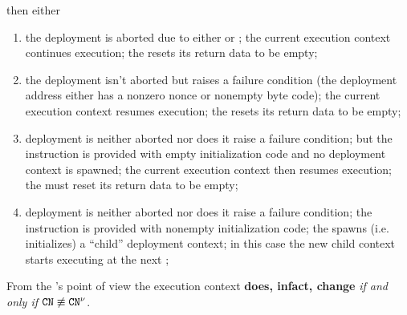 \begin{description}
		then either
		\begin{enumerate}
			\item
				the deployment is aborted due to either \balAbortSH{} or \csdAbortSH{};
				the current execution context continues execution;
				the \zkEvm{} resets its return data to be empty;
			\item
				the deployment isn't aborted but raises a failure condition (the deployment address either has a nonzero nonce or nonempty byte code);
				the current execution context resumes execution;
				the \zkEvm{} resets its return data to be empty;
			\item
				deployment is neither aborted nor does it raise a failure condition;
				but the instruction is provided with empty initialization code and no deployment context is spawned;
				the current execution context then resumes execution;
				the \zkEvm{} must reset its return data to be empty;
			\item
				deployment is neither aborted nor does it raise a failure condition;
				the instruction is provided with nonempty initialization code;
				the \zkEvm{} spawns (i.e. initializes) a ``child'' deployment context;
				in this case the new child context starts executing at the next \hubStamp{};
		\end{enumerate}
\end{description}
\saNote{} From the \zkEvm{}'s point of view the execution context \textbf{does, infact, change} \emph{if and only if} $\texttt{CN} \not\equiv \texttt{CN}^{\nu}$.
